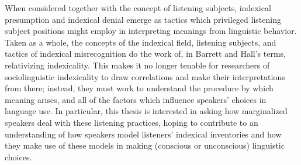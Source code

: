 \documentclass[12pt,twoside]{reedthesis}
\begin{document}
When considered together with the concept of listening subjects, indexical presumption and indexical denial emerge as tactics which privileged listening subject positions might employ in interpreting meanings from linguistic behavior. Taken as a whole, the concepts of the indexical field, listening subjects, and tactics of indexical misrecognition do the work of, in Barrett and Hall's terms, relativizing indexicality. This makes it no longer tenable for researchers of sociolinguistic indexicality to draw correlations and make their interpretations from there; instead, they must work to understand the procedure by which meaning arises, and all of the factors which influence speakers' choices in language use. In particular, this thesis is interested in asking how marginalized speakers deal with these listening practices, hoping to contribute to an understanding of how speakers model listeners' indexical inventories and how they make use of these models in making (conscious or unconscious) linguistic choices.

\end{document}

